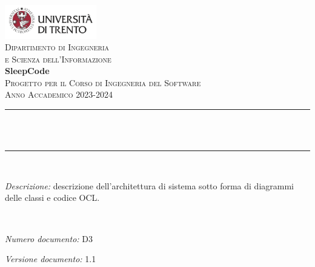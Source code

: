 \begin{titlepage}
    \newcommand{\HRule}{\rule{\linewidth}{0.3mm}} %
    \center %
    
    \includegraphics[width=0.3\textwidth]{materiale/elementi-copertina/UniTrento_logo_ITA_colore.png}\\[0.5cm]
    \textsc{\Large Dipartimento di Ingegneria\\e Scienza dell'Informazione}\\[1.5cm]
    
    {\Huge\textbf{SleepCode}}\\[0.5cm]
    \textsc{\large Progetto per il Corso di Ingegneria del Software}\\
    \textsc{\large Anno Accademico 2023-2024}\\[0.5cm]
    
    
    \HRule\\[0.4cm]
    {\huge\bfseries \@title}\\[0.1cm]
    \HRule\\[1cm]
    
    \begin{minipage}{\textwidth}
    \textit{Descrizione:} descrizione dell'architettura di sistema sotto forma di diagrammi delle classi e codice OCL.
    \end{minipage}\\[1.5cm]
    
    
    \begin{minipage}{0.4\textwidth}
    \begin{flushleft}
    \large
    \textit{Numero documento:} D3
    \end{flushleft}
    \end{minipage}
    \begin{minipage}{0.4\textwidth}
    \begin{flushright}
    \large
    \textit{Versione documento:} 1.1
    \end{flushright}
    \end{minipage}\\[1.5cm]
    

\end{titlepage}
